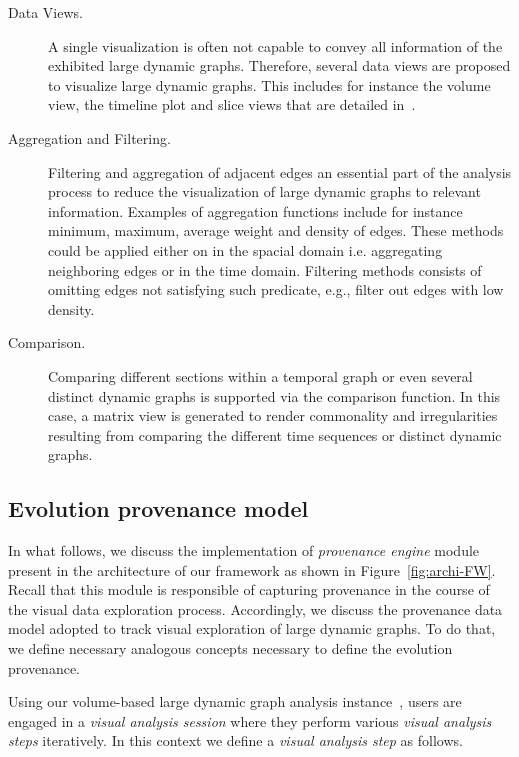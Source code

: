 \begin{description}
	\item[Data Views.] 
A single visualization is often not capable to convey all information of the exhibited large dynamic graphs.
Therefore, several data views are proposed to visualize large dynamic graphs.
This includes for instance the volume view, the timeline plot and slice views that are detailed in~\cite{Bruder2019}.
	\item[Aggregation and Filtering.] 
Filtering and aggregation of adjacent edges an essential part of the analysis process to reduce the visualization of large dynamic graphs to relevant information.
Examples of aggregation functions include for instance minimum, maximum, average weight and density of edges. These methods could be applied either on in the spacial domain i.e. aggregating neighboring edges or in the time domain.
Filtering methods consists of omitting edges not satisfying such predicate, e.g., filter out edges with low density.
\item[Comparison.] 
Comparing different sections within a temporal graph or even several distinct dynamic graphs is supported via the comparison function. 
In this case, a matrix view is generated to render commonality and irregularities resulting from comparing the different time sequences or distinct dynamic graphs.
\end{description}

		
\subsection{Evolution provenance model}
\label{A02:evoDM}
{\color{Fuchsia}In what follows, we discuss the implementation of \emph{provenance engine} module present in the architecture of our framework as shown in Figure~\ref{fig:archi-FW}.
Recall that this module is responsible of capturing provenance in the course of the visual data exploration process. Accordingly, we discuss the provenance data model adopted to track visual exploration of large dynamic graphs.
To do that, we define necessary analogous concepts necessary to define the evolution provenance.}

Using our volume-based large dynamic graph analysis instance~\cite{Bruder2019},
users are engaged in a \emph{visual analysis session} where they perform various \emph{visual analysis steps} iteratively.  In this context we define a  \emph{visual analysis step}  as follows.

